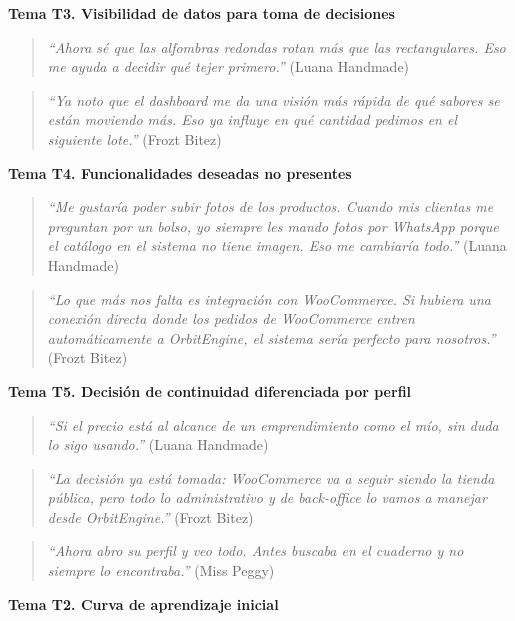 \textbf{Tema T3. Visibilidad de datos para toma de decisiones}

\begin{quote}
\emph{``Ahora sé que las alfombras redondas rotan más que las rectangulares. Eso me ayuda a decidir qué tejer primero.''} (Luana Handmade)
\end{quote}

\begin{quote}
\emph{``Ya noto que el dashboard me da una visión más rápida de qué sabores se están moviendo más. Eso ya influye en qué cantidad pedimos en el siguiente lote.''} (Frozt Bitez)
\end{quote}

\textbf{Tema T4. Funcionalidades deseadas no presentes}

\begin{quote}
\emph{``Me gustaría poder subir fotos de los productos. Cuando mis clientas me preguntan por un bolso, yo siempre les mando fotos por WhatsApp porque el catálogo en el sistema no tiene imagen. Eso me cambiaría todo.''} (Luana Handmade)
\end{quote}

\begin{quote}
\emph{``Lo que más nos falta es integración con WooCommerce. Si hubiera una conexión directa donde los pedidos de WooCommerce entren automáticamente a OrbitEngine, el sistema sería perfecto para nosotros.''} (Frozt Bitez)
\end{quote}

\textbf{Tema T5. Decisión de continuidad diferenciada por perfil}

\begin{quote}
\emph{``Si el precio está al alcance de un emprendimiento como el mío, sin duda lo sigo usando.''} (Luana Handmade)
\end{quote}

\begin{quote}
\emph{``La decisión ya está tomada: WooCommerce va a seguir siendo la tienda pública, pero todo lo administrativo y de back-office lo vamos a manejar desde OrbitEngine.''} (Frozt Bitez)
\end{quote}

\begin{quote}
\emph{``Ahora abro su perfil y veo todo. Antes buscaba en el cuaderno y no siempre lo encontraba.''} (Miss Peggy)
\end{quote}

\textbf{Tema T2. Curva de aprendizaje inicial}

